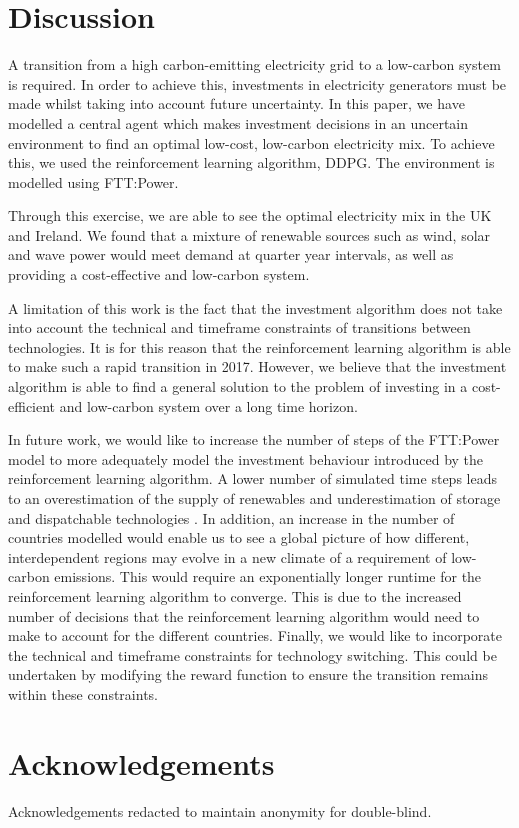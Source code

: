 \documentclass{article}
\begin{document}


\section{Discussion}

A transition from a high carbon-emitting electricity grid to a low-carbon system is required. In order to achieve this, investments in electricity generators must be made whilst taking into account future uncertainty. In this paper, we have modelled a central agent which makes investment decisions in an uncertain environment to find an optimal low-cost, low-carbon electricity mix. To achieve this, we used the reinforcement learning algorithm, DDPG. The environment is modelled using FTT:Power.

Through this exercise, we are able to see the optimal electricity mix in the UK and Ireland. We found that a mixture of renewable sources such as wind, solar and wave power would meet demand at quarter year intervals, as well as providing a cost-effective and low-carbon system.

A limitation of this work is the fact that the investment algorithm does not take into account the technical and timeframe constraints of transitions between technologies. It is for this reason that the reinforcement learning algorithm is able to make such a rapid transition in 2017. However, we believe that the investment algorithm is able to find a general solution to the problem of investing in a cost-efficient and low-carbon system over a long time horizon.

In future work, we would like to increase the number of steps of the FTT:Power model to more adequately model the investment behaviour introduced by the reinforcement learning algorithm. A lower number of simulated time steps leads to an overestimation of the supply of renewables and underestimation of storage and dispatchable technologies \cite{Ludig2011}. In addition, an increase in the number of countries modelled would enable us to see a global picture of how different, interdependent regions may evolve in a new climate of a requirement of low-carbon emissions. This would require an exponentially longer runtime for the reinforcement learning algorithm to converge. This is due to the increased number of decisions that the reinforcement learning algorithm would need to make to account for the different countries. Finally, we would like to incorporate the technical and timeframe constraints for technology switching. This could be undertaken by modifying the reward function to ensure the transition remains within these constraints.




\section{Acknowledgements}

Acknowledgements redacted to maintain anonymity for double-blind. 






\end{document}
